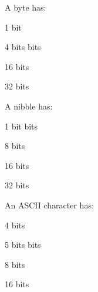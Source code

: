 
\begin{problem}{4}
	A byte has:
	\begin{mchoice}
		\item 1 bit
		\item 4 bits
		 bits
		\item 16 bits
		\item 32 bits
	\end{mchoice}
\end{problem}

\begin{problem}{4}
	A nibble has:
	\begin{mchoice}
		\item 1 bit
		 bits
		\item 8 bits
		\item 16 bits
		\item 32 bits
	\end{mchoice}
\end{problem}

\begin{problem}{4}
  An ASCII character has:
	\begin{mchoice}
		\item 4 bits
		\item 5 bits
		 bits
		\item 8 bits
		\item 16 bits
	\end{mchoice}
\end{problem}
